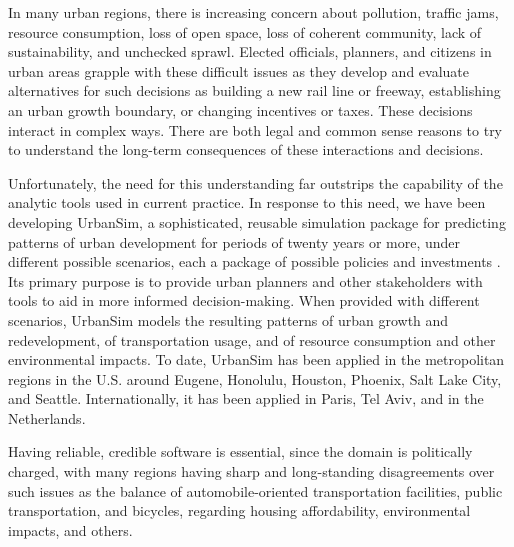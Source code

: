 \documentclass{sig-alternate-preprint}
\begin{document}
In many urban regions, there is increasing concern 
about pollution, traffic jams,
resource consumption, loss of open space, loss of coherent community, lack of
sustainability, and unchecked sprawl.  Elected officials, planners, and
citizens in urban areas grapple with these difficult issues as they develop
and evaluate alternatives for such decisions as building a new rail line or
freeway, establishing an urban growth boundary, or changing incentives or
taxes.  These decisions interact in complex ways.  There are both legal and
common sense reasons to try to understand the long-term consequences of these
interactions and decisions.

Unfortunately, the need for this understanding far outstrips
the capability of the analytic tools used in current practice.  In response
to this need, we have been developing UrbanSim, a sophisticated, reusable
simulation package for predicting patterns of urban development for periods
of twenty years or more, under different possible scenarios, each a package
of possible policies and investments 
\cite{waddell-japa-2002,waddell-nse-2003}.  Its
primary purpose is to provide urban planners and other stakeholders with
tools to aid in more informed decision-making.  When provided with
different scenarios,
UrbanSim models the resulting patterns of urban growth and redevelopment,
of transportation usage, and of resource consumption and other
environmental impacts.  To date, UrbanSim has been applied in the
metropolitan regions in the U.S. around Eugene,
Honolulu, Houston, Phoenix, Salt Lake City, and Seattle.
Internationally, it has
been applied in Paris, Tel Aviv, and in the Netherlands.

Having reliable, credible software is essential, since
the domain is politically charged, with many regions having sharp and
long-standing disagreements over such issues as the balance of
automobile-oriented transportation facilities, public transportation, and
bicycles, regarding housing affordability, environmental impacts, and
others.  
\end{document}
